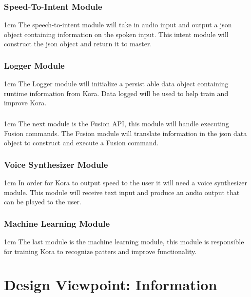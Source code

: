 \documentclass[onecolumn, draftclsnofoot,10pt, compsoc]{IEEEtran}
\def \botname{Kora\xspace}
\newenvironment{indentItem}[1][1cm]{\begin{adjustwidth}{#1}{}}{\end{adjustwidth}}
\begin{document}
		\subsubsection{Speed-To-Intent Module}
			\begin{indentItem}
				The speech-to-intent module will take in audio input and output a json object containing information on the spoken input.
				This intent module will construct the json object and return it to master.
			\end{indentItem}
		\subsubsection{Logger Module}
			\begin{indentItem}
				The Logger module will initialize a persist able data object containing runtime information from \botname.
				Data logged will be used to help train and improve \botname.
			\end{indentItem}
		\subsubsection{}
			\begin{indentItem}
				The next module is the Fusion API, this module will handle executing Fusion commands.
				The Fusion module will translate information in the json data object to construct and execute a Fusion command.
			\end{indentItem}
		\subsubsection{Voice Synthesizer Module}
			\begin{indentItem}
				In order for \botname to output speed to the user it will need a voice synthesizer module.
				This module will receive text input and produce an audio output that can be played to the user.
			\end{indentItem}		
		\subsubsection{Machine Learning Module}
			\begin{indentItem}
				The last module is the machine learning module, this module is responsible for training \botname to recognize patters and improve functionality.
			\end{indentItem}
		
\section{Design Viewpoint: Information}
\end{document}
